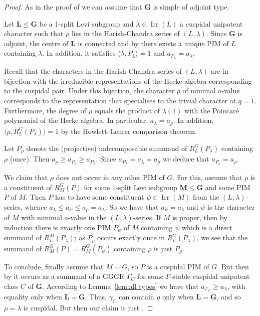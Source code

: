 \documentclass[12pt,leqno,a4paper]{amsart}
\newcommand{\bG}{{\mathbf{G}}}
\newcommand{\bL}{{\mathbf{L}}}
\newcommand{\bM}{{\mathbf{M}}}
\newcommand{\Irr}{{\operatorname{Irr}}}
\newcommand\RLG{{R_L^G}}
\let\la=\lambda
\theoremstyle{remark}
\begin{document}
\begin{proof}
As in the proof of \cite[Thm.~A]{DM17} we can assume that $\bG$ is simple
of adjoint type.
\par
Let $\bL\le \bG$ be a 1-split Levi subgroup and $\la\in\Irr(L)$ a cuspidal
unipotent character such that $\rho$ lies in the Harish-Chandra series of
$(L,\la)$. Since $\bG$ is adjoint, the centre of $\bL$ is connected
and by \cite[Thm.~A]{DM17} there exists a unique PIM of $L$ containing $\la$.
In addition, it satisfies $\langle\la,P_\la\rangle=1$ and $a_{P_\la} = a_\la$.
\par
Recall that the characters in the Harish-Chandra series of $(L,\la)$ are in
bijection with the irreducible representations of the Hecke algebra
corresponding to the cuspidal pair. Under this bijection, the character
$\rho$ of minimal $a$-value corresponds to the representation that specialises
to the trivial character at $q=1$. Furthermore, the degree of $\rho$ equals
the product of $\la(1)$ with the Poincar\'e polynomial of the Hecke
algebra. In particular, $a_\la = a_\rho$. In addition,
$\langle\rho,\RLG(P_\la)\rangle=1$ by the Howlett--Lehrer comparison theorem.
\par
Let $P_\rho$ denote the (projective) indecomposable summand of $\RLG(P_\la)$
containing $\rho$ (once). Then $a_\rho \geq a_{P_\rho} \geq a_{P_\lambda}$.
Since $a_{P_\la} = a_{\la} = a_\rho$ we deduce that $a_{P_\rho} = a_\rho$.
\par
We claim that $\rho$ does not occur in any other PIM of $G$. For this, assume
that $\rho$ is a constituent of $R_M^G(P)$ for some $1$-split Levi subgroup
$\bM\le \bG$
and some PIM $P$ of $M$. Then $P$ has to have some constituent $\psi\in\Irr(M)$
from the $(L,\la)$-series, whence $a_\la\le a_\psi\le a_\rho=a_\la$. So we have
that $a_\psi=a_\la$ and $\psi$ is the character of $M$ with minimal $a$-value
in the $(L,\la)$-series. If $M$ is proper, then by induction there is exactly
one PIM $P_\psi$ of $M$ containing $\psi$ which is a direct summand
of $R_L^M(P_\la)$; as $P_\rho$ occurs exactly once in $\RLG(P_\la)$, we see
that the summand of $R_M^G(P)=R_M^G(P_\psi)$ containing $\rho$ is just
$P_\rho$.   \par
To conclude, finally assume that $M=G$, so $P$ is a cuspidal PIM of $G$. But
then by \cite[Prop.~2.2]{DM17} it
occurs as a summand of a GGGR $\Gamma_C$ for some $F$-stable cuspidal unipotent
class $C$ of $\bG$. According to Lemma~\ref{lem:all types} we have that
$a_{\Gamma_C}\ge a_\la$, with equality only when $\bL=\bG$. Thus, $\gamma_C$ can
contain $\rho$ only when $\bL=\bG$, and so $\rho=\la$ is cuspidal. But then
our claim is just \cite[Thm.~A]{DM17}.
\end{proof}
\end{document}
